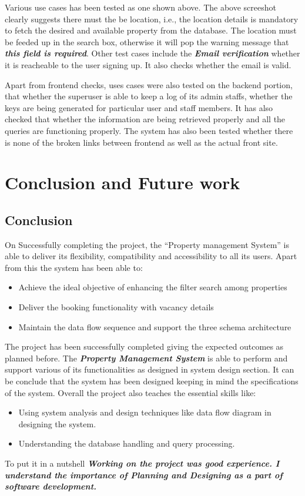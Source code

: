 \documentclass[12pt]{report}
\begin{document}
Various use cases has been tested as one shown above. The above screeshot clearly suggests there must the be location, i.e., the location details is mandatory to fetch the desired and available property from the database. The location must be feeded up in the search box, otherwise it will pop the warning message that \textbf{\textit{this field is required}}. Other test cases include the \textbf{\textit{Email verification}} whether it is reacheable to the user signing up. It also checks whether the email is valid. \newline

Apart from frontend checks, uses cases were also tested on the backend portion, that whether the superuser is able to keep a log of its admin staffs, whether the keys are being generated for particular user and staff members. It has also checked that whether the information are being retrieved properly and all the queries are functioning properly. The system has also been tested whether there is none of the broken links between frontend as well as the actual front site.
 




\chapter{Conclusion and Future work }
\section{Conclusion}
On Successfully completing the project, the “Property management System” is
able to deliver its flexibility, compatibility and accessibility to all its users. Apart
from this the system has been able to:
\begin{itemize}
\item Achieve the ideal objective of enhancing the filter search among
properties
\item Deliver the booking functionality with vacancy details
\item Maintain the data flow sequence and support the three schema
architecture
\end{itemize}

The project has been successfully completed giving the expected outcomes as planned before. The \textbf{\textit{Property Management System}} is able to perform and support various of its functionalities as designed in system design section. It can be conclude that the system has been designed keeping in mind the specifications of the system.  Overall the project also teaches the essential skills like:
\begin{itemize}

\item Using system analysis and design techniques like data flow diagram in designing the system.

\item Understanding the database handling and query processing.
\end{itemize}
To put it in a nutshell \textbf{\textit{Working on the project was good experience. I understand the importance of Planning and Designing as a part of software development.}}
\end{document}
